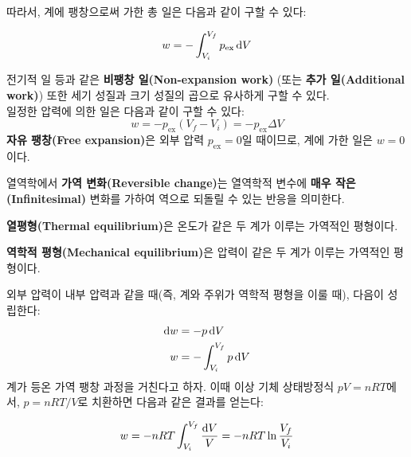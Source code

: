             따라서, 계에 팽창으로써 가한 총 일은 다음과 같이 구할 수 있다:
            \begin{law}[팽창으로 인한 일]
                \begin{equation*}
                    w = -\int_{V_i}^{V_f}p_{\mathrm{ex}}\operatorname{d\!} V
                \end{equation*}
            \end{law}
            전기적 일 등과 같은 \textbf{비팽창 일(Non-expansion work)} (또는 \textbf{추가 일(Additional work)}) 또한 세기 성질과 
            크기 성질의 곱으로 유사하게 구할 수 있다. \\
            일정한 압력에 의한 일은 다음과 같이 구할 수 있다:
                \begin{equation*}
                    w = -p_{\mathrm{ex}}\left(V_f - V_i \right) = -p_{\mathrm{ex}}\Delta V
                \end{equation*}
            \textbf{자유 팽창(Free expansion)}은 외부 압력 $p_\mathrm{ex} = 0$일 때이므로, 계에 가한 일은 $w = 0$이다.
            \par \begin{defn}[가역 변화]
            열역학에서 \textbf{가역 변화(Reversible change)}는 열역학적 변수에 \textbf{매우 작은(Infinitesimal)} 변화를 가하여 역으로 되돌릴 수 있는 
            반응을 의미한다.
            \end{defn}
            \begin{defn}
            \begin{enum}
            \item \textbf{열평형(Thermal equilibrium)}은 온도가 같은 두 계가 이루는 가역적인 평형이다.
            \item \textbf{역학적 평형(Mechanical equilibrium)}은 압력이 같은 두 계가 이루는 가역적인 평형이다.
            \end{enum}
            \end{defn}
            외부 압력이 내부 압력과 같을 때(즉, 계와 주위가 역학적 평형을 이룰 때), 다음이 성립한다:
            \begin{align*}
                \operatorname{d\!} w &= -p \operatorname{d\!} V\\
                w &= - \int_{V_i}^{V_f} p \operatorname{d\!} V
            \end{align*}
            계가 등온 가역 팽창 과정을 거친다고 하자. 이때 이상 기체 상태방정식 $pV = nRT$에서, $p = nRT / V$로 치환하면 다음과 같은 결과를 얻는다:
            \begin{obs}[등온 가역 과정]
                \begin{equation*}
                    w = -nRT\int_{V_i}^{V_f} \frac{\operatorname{d\!} V}{V} = -nRT \ln{\frac{V_f}{V_i}}
                \end{equation*}
            \end{obs}
